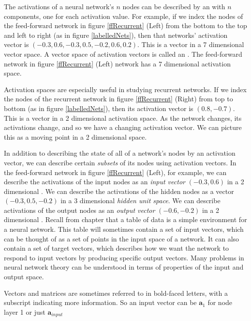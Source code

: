   The activations of a neural network's $n$ nodes can be described by an  with $n$ components, one for each activation value. For example, if we index the nodes of the feed-forward network in figure \ref{ffRecurrent} (Left) from the bottom to the top and left to right (as in figure \ref{labelledNets}), then that networks' activation vector is $(-0.3,0.6,-0.3,0.5,-0.2,0.6,0.2)$. This 
is a vector in a 7 dimensional vector space. A vector space of activation 
vectors is called an . The feed-forward network in figure \ref{ffRecurrent} (Left)  network has a 7 dimensional activation space.

Activation spaces are especially useful in studying recurrent networks. If we index the nodes of the recurrent network in figure \ref{ffRecurrent} (Right) from top to bottom (as in figure \ref{labelledNets}), then its activation vector is $(0.8,-0.7)$. This is a vector in a 2 dimensional activation
space. As the network changes, its activations change, and so we have a changing activation vector. We can picture  this as a moving point in a 2 dimensional space. 

In addition to describing the state of all of a network's nodes by an activation vector, we can describe certain {\em subsets} of its nodes using activation vectors. In the feed-forward network in figure \ref{ffRecurrent} (Left), for example, we can describe the activations of the input nodes as an  \emph{input vector}  $(-0.3,0.6)$  in a 2 dimensional . We can describe the activations of the hidden nodes as a vector $(-0.3,0.5,-0.2)$ in a 3 dimensional 
\emph{hidden unit space}. We can describe activations of the output nodes as an \emph{output vector} $(-0.6,-0.2)$ in a 2 dimensional . Recall from chapter  that a table of data is a simple environment for a neural network. This table will sometimes contain a set of input vectors, which can be thought of as a set of points in the input space of a network. It can also contain a set of target vectors, which describes how we want the network to respond to input vectors by producing specific output vectors. Many problems in neural network theory can be understood in terms of properties of the input and output space.
 
 Vectors and matrices are sometimes referred to in bold-faced letters, with a subscript indicating more information. So an input vector can be $\textbf{a}_{1}$ for node layer 1 or just $\textbf{a}_{input}$

